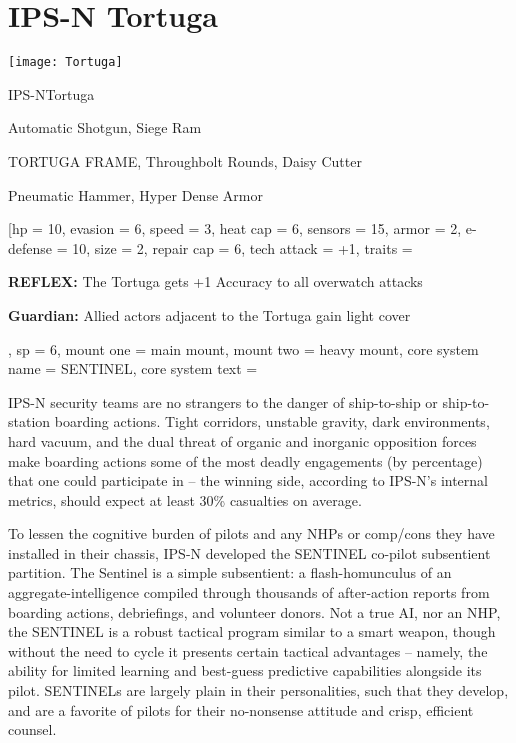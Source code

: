 \section{IPS-N Tortuga}

\begin{center}
    \texttt{[image: Tortuga]}
\end{center}

\begin{mech}{IPS-N}{Tortuga}


\begin{license}
\item Automatic Shotgun, Siege Ram
\item TORTUGA FRAME, Throughbolt Rounds, Daisy Cutter
\item Pneumatic Hammer, Hyper Dense Armor
\end{license}

\frameBox
[hp = 10,
evasion = 6,
speed = 3,
heat cap = 6,
sensors = 15,
armor = 2,
e-defense = 10,
size = 2,
repair cap = 6,
tech attack = +1,
traits = {\textbf{REFLEX:} The Tortuga gets +1 Accuracy to all overwatch attacks

\textbf{Guardian:} Allied actors adjacent to the Tortuga gain light cover },
sp = 6,
mount one = main mount,
mount two = heavy mount,
core system name = SENTINEL,
core system text = {IPS-N security teams are no strangers to the danger of ship-to-ship or ship-to-station boarding actions. Tight corridors, unstable gravity, dark environments, hard vacuum, and the dual threat of organic and inorganic opposition forces make boarding actions some of the most deadly engagements (by percentage) that one could participate in -- the winning side, according to IPS-N’s internal metrics, should expect at least 30\% casualties on average.

To lessen the cognitive burden of pilots and any NHPs or comp/cons they have installed in their chassis, IPS-N developed the SENTINEL co-pilot subsentient partition. The Sentinel is a simple subsentient: a flash-homunculus of an aggregate-intelligence compiled through thousands of after-action reports from boarding actions, debriefings, and volunteer donors. Not a true AI, nor an NHP, the SENTINEL is a robust tactical program similar to a smart weapon, though without the need to cycle it presents certain tactical advantages -- namely, the ability for limited learning and best-guess predictive capabilities alongside its pilot. SENTINELs are largely plain in their personalities, such that they develop, and are a favorite of pilots for their no-nonsense attitude and crisp, efficient counsel. 

}
\end{mech}
